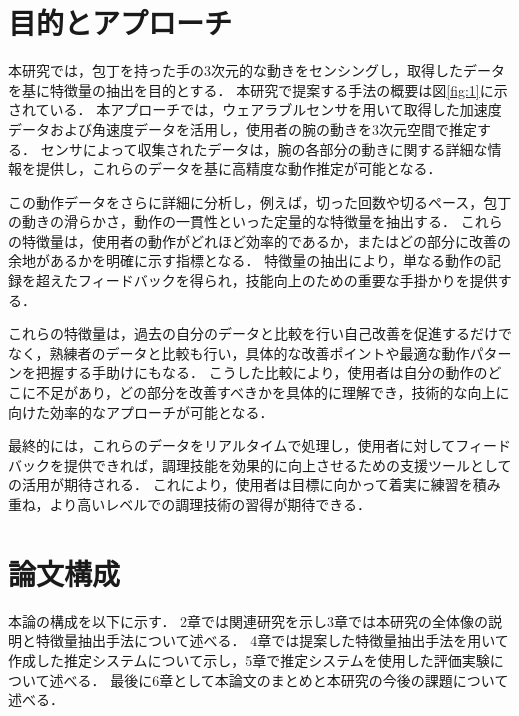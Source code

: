 \section{目的とアプローチ}
本研究では，包丁を持った手の3次元的な動きをセンシングし，取得したデータを基に特徴量の抽出を目的とする．
本研究で提案する手法の概要は図\ref{fig:1}に示されている．
本アプローチでは，ウェアラブルセンサを用いて取得した加速度データおよび角速度データを活用し，使用者の腕の動きを3次元空間で推定する．
センサによって収集されたデータは，腕の各部分の動きに関する詳細な情報を提供し，これらのデータを基に高精度な動作推定が可能となる．

この動作データをさらに詳細に分析し，例えば，切った回数や切るペース，包丁の動きの滑らかさ，動作の一貫性といった定量的な特徴量を抽出する．
これらの特徴量は，使用者の動作がどれほど効率的であるか，またはどの部分に改善の余地があるかを明確に示す指標となる．
特徴量の抽出により，単なる動作の記録を超えたフィードバックを得られ，技能向上のための重要な手掛かりを提供する．

これらの特徴量は，過去の自分のデータと比較を行い自己改善を促進するだけでなく，熟練者のデータと比較も行い，具体的な改善ポイントや最適な動作パターンを把握する手助けにもなる．
こうした比較により，使用者は自分の動作のどこに不足があり，どの部分を改善すべきかを具体的に理解でき，技術的な向上に向けた効率的なアプローチが可能となる．

最終的には，これらのデータをリアルタイムで処理し，使用者に対してフィードバックを提供できれば，調理技能を効果的に向上させるための支援ツールとしての活用が期待される．
これにより，使用者は目標に向かって着実に練習を積み重ね，より高いレベルでの調理技術の習得が期待できる．

\section{論文構成}
本論の構成を以下に示す．
2章では関連研究を示し3章では本研究の全体像の説明と特徴量抽出手法について述べる．
4章では提案した特徴量抽出手法を用いて作成した推定システムについて示し，5章で推定システムを使用した評価実験について述べる．
最後に6章として本論文のまとめと本研究の今後の課題について述べる．